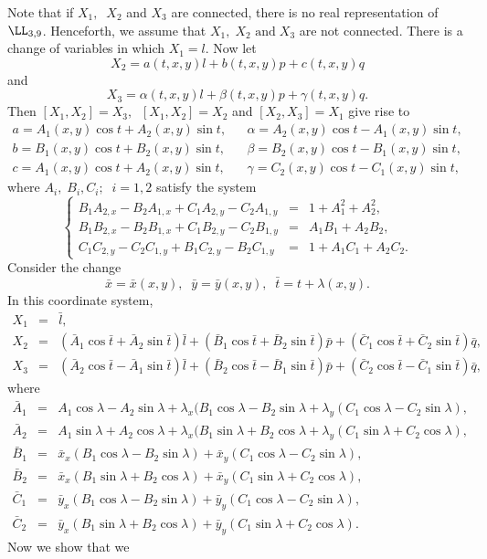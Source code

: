 Note that if
$X_1,\;\;X_2$ and $X_3$ are connected, there is no real representation of
$\LL _{3,9}$. Henceforth, we assume that $X_1,\;X_2\mbox{ and}\;X_3$ are
not connected. There is a change of variables in which $X_1=l$. Now let
\[X_2=a(t,x,y)l+b(t,x,y)p+c(t,x,y)q\] and \[X_3=\alpha (t,x,y)l+\beta
(t,x,y)p+\gamma (t,x,y)q.\] Then
$[X_1,X_2]=X_3,\;\;[X_1,X_2]=X_2$ and $[X_2,X_3]=X_1$  give rise to 
\begin{eqnarray*} a=A_1(x,y)\cos t+A_2(x,y)\sin t, & &\alpha=A_2(x,y)\cos
t-A_1(x,y)\sin t ,\\ b=B_1(x,y)\cos t+B_2(x,y)\sin t, &
&\beta=B_2(x,y)\cos t-B_1(x,y)\sin t ,\\ c=A_1(x,y)\cos t+A_2(x,y)\sin t,
& &\gamma=C_2(x,y)\cos t-C_1(x,y)\sin t , \end{eqnarray*} where
$A_i,\;B_i,C_i;\;\;i=1,2$  satisfy the system \begin{equation} \label{ch7:eq1}
\left \{ \begin{array}{lll} B_1A_{2,x}-B_2A_{1,x}+C_1A_{2,y}-C_2A_{1,y}
&=& 1+A_1^2+A_2^2,\\ B_1B_{2,x}-B_2B_{1,x}+C_1B_{2,y}-C_2B_{1,y} &=&
A_1B_1+A_2B_2,\\ C_1C_{2,y}-C_2C_{1,y}+B_1C_{2,y}-B_2C_{1,y} &=&
1+A_1C_1+A_2C_2. \end{array} \right. \end{equation} Consider the change 
\[\bar x=\bar x(x,y),\;\;\bar y= \bar y(x,y),\;\;\bar
t=t+\lambda (x,y).\] In this coordinate system, \begin{eqnarray*} X_1
&=&\bar l, \\ X_2 &=& (\bar A_1\cos \bar t +\bar A_2\sin \bar t)\bar l
        +(\bar B_1\cos \bar t +\bar B_2\sin \bar t)\bar p   
        +(\bar C_1\cos \bar t +\bar C_2\sin \bar t)\bar q,\\   
X_3 &=& (\bar A_2\cos \bar t -\bar A_1\sin \bar t)\bar l
        +(\bar B_2\cos \bar t -\bar B_1\sin \bar t)\bar p   
        +(\bar C_2\cos \bar t -\bar C_1\sin \bar t)\bar q,   
\end{eqnarray*}        
where
\begin{eqnarray*}
\bar A_1 &=& A_1\cos \lambda-A_2\sin \lambda+\lambda_x(B_1\cos
\lambda-B_2\sin \lambda+\lambda_y(C_1 \cos \lambda-C_2\sin \lambda),\\
\bar A_2 &=& A_1\sin \lambda+A_2\cos \lambda+\lambda_x(B_1\sin
\lambda+B_2\cos \lambda+\lambda_y(C_1 \sin \lambda+C_2\cos \lambda),\\
\bar B_1 &=& \bar x_x(B_1\cos \lambda-B_2\sin \lambda)+\bar x_y(C_1\cos
\lambda-C_2\sin \lambda),\\ \bar B_2 &=& \bar x_x(B_1\sin \lambda+B_2\cos
\lambda) +\bar x_y(C_1\sin \lambda+C_2\cos \lambda),\\ \bar C_1 &=& \bar
y_x(B_1\cos \lambda-B_2\sin \lambda)+\bar y_y(C_1\cos \lambda-C_2\sin
\lambda),\\ \bar C_2 &=& \bar y_x(B_1\sin \lambda+B_2\cos \lambda) +\bar
y_y(C_1\sin \lambda+C_2\cos \lambda). \end{eqnarray*} Now we show that we
